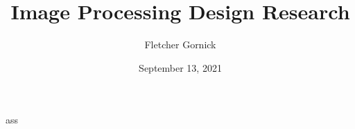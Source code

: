\documentclass[10pt]{article}
\title{Image Processing Design Research}
\author{Fletcher Gornick}
\date{September 13, 2021}
\begin{document}
\maketitle
ass
\end{document}
